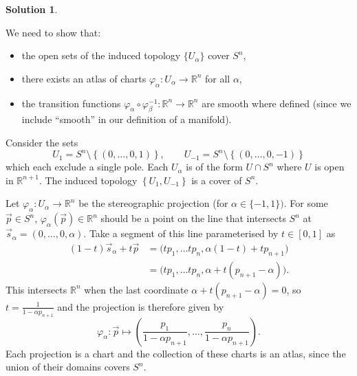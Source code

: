 \documentclass[11pt, a4paper]{report}
\theoremstyle{definition}
\newtheorem{solution}{Solution}[part]
\newenvironment{sol}{\begin{solution}}{\end{solution}\pagebreak[3]}
\begin{document}
\begin{sol}\label{sol:stereographicprojection}

We need to show that:
\begin{itemize}
    \item the open sets of the induced topology $\{U_\alpha\}$ cover $S^n$,
    \item there exists an atlas of charts $\varphi_\alpha: U_\alpha \to \mathbb{R}^n$ for all $\alpha$,
    \item the transition functions $\varphi_\alpha \circ \varphi_\beta^{-1}: \mathbb{R}^n \to \mathbb{R}^n$ are smooth where defined (since we include ``smooth'' in our definition of a manifold).
\end{itemize}

Consider the sets
\[
    U_1 = S^n \setminus \left\{(0, \ldots, 0, 1)\right\}, \qquad
    U_{-1} = S^n \setminus \left\{(0, \ldots, 0, -1)\right\}
\]
which each exclude a single pole. Each $U_\alpha$ is of the form $U \cap S^n$ where $U$ is open in $\mathbb{R}^{n + 1}$.
The induced topology $\left\{U_1, U_{-1}\right\}$ is a cover of $S^n$.

Let $\varphi_\alpha: U_\alpha \to \mathbb{R}^n$ be the stereographic projection (for $\alpha \in \{-1, 1\})$.
For some $\vec{p} \in S^n$, $\varphi_\alpha(\vec{p}) \in \mathbb{R}^n$ should be a point on the line that intersects $S^n$ at $\vec{s}_\alpha = (0, \ldots, 0, \alpha)$.
Take a segment of this line parameterised by $t \in [0, 1]$ as
\begin{align*}
    (1 - t) \vec{s}_\alpha + t\vec{p} &= \bigl( t p_1, \ldots t p_n, \alpha(1 - t) + tp_{n + 1} \bigr) \\
        &= \bigl( t p_1, \ldots t p_n, \alpha + t(p_{n + 1} - \alpha) \bigr).
\end{align*}
This intersects $\mathbb{R}^n$ when the last coordinate $\alpha + t(p_{n + 1} - \alpha) = 0$, so $t = \frac{1}{1 - \alpha p_{n + 1}}$ and the projection is therefore given by
\[
    \varphi_\alpha: \vec{p} \mapsto \left(\frac{p_1}{1 - \alpha p_{n + 1}}, \ldots, \frac{p_n}{1 - \alpha p_{n + 1}}\right).
\]
Each projection is a chart and the collection of these charts is an atlas, since the union of their domains covers $S^n$.


\end{sol}
\end{document}
